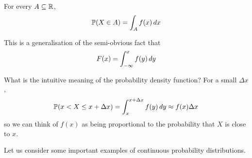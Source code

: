 \documentclass{../../template/note}
\begin{document}
    \begin{proposition}
        For every \(A \subseteq \mathbb R\),
        \begin{align*}
            \mathbb P(X \in A) = \int_A f(x) \,d{x}
        \end{align*}
    \end{proposition}
    
    \begin{remark*}
        This is a generalisation of the semi-obvious fact that
        \begin{align*}
            F(x) = \int_{-\infty}^x f(y) \,d{y}
        \end{align*}
    \end{remark*}
    What is the intuitive meaning of the probability density function? For a small \(\Delta x\),
    \begin{align*}
        \mathbb P(x < X \leq x + \Delta x) = \int_x^{x+\Delta x} f(y) \,d{y} \approx f(x) \Delta x
    \end{align*}
    so we can think of \(f(x)\) as being proportional to the probability that \(X\) is close to \(x\).

    Let us consider some important examples of continuous probability distributions.
\end{document}

